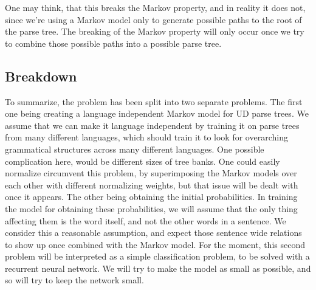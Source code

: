 One may think, that this breaks the Markov property, and in reality it does not, since we're using a Markov model only to generate possible paths to the root of the parse tree. The breaking of the Markov property will only occur once we try to combine those possible paths into a possible parse tree.
\clearpage

\subsection{Breakdown}
    To summarize, the problem has been split into two separate problems. The first one being creating a language independent Markov model for UD parse trees. We assume that we can make it language independent by training it on parse trees from many different languages, which should train it to look for overarching grammatical structures across many different languages. One possible complication here, would be different sizes of tree banks. One could easily normalize circumvent this problem, by superimposing the Markov models over each other with different normalizing weights, but that issue will be dealt with once it appears.
    The other being obtaining the initial probabilities. In training the model for obtaining these probabilities, we will assume that the only thing affecting them is the word itself, and not the other words in a sentence. We consider this a reasonable assumption, and expect those sentence wide relations to show up once combined with the Markov model. For the moment, this second problem will be interpreted as a simple classification problem, to be solved with a recurrent neural network. We will try to make the model as small as possible, and so will try to keep the network small.


